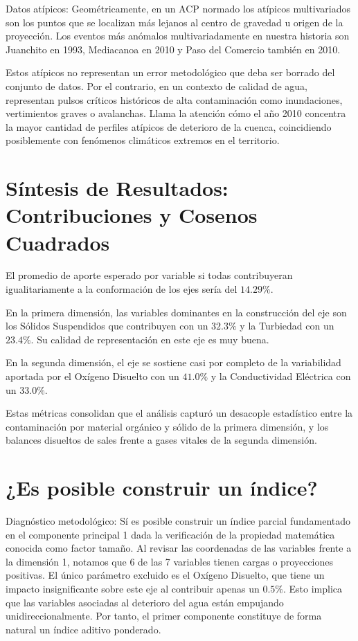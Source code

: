 \documentclass{article} %
\begin{document}
Datos atípicos: Geométricamente, en un ACP normado los atípicos multivariados son los puntos que se localizan más lejanos al centro de gravedad u origen de la proyección. Los eventos más anómalos multivariadamente en nuestra historia son Juanchito en 1993, Mediacanoa en 2010 y Paso del Comercio también en 2010.

Estos atípicos no representan un error metodológico que deba ser borrado del conjunto de datos. Por el contrario, en un contexto de calidad de agua, representan pulsos críticos históricos de alta contaminación como inundaciones, vertimientos graves o avalanchas. Llama la atención cómo el año 2010 concentra la mayor cantidad de perfiles atípicos de deterioro de la cuenca, coincidiendo posiblemente con fenómenos climáticos extremos en el territorio.

\section{Síntesis de Resultados: Contribuciones y Cosenos Cuadrados}
El promedio de aporte esperado por variable si todas contribuyeran igualitariamente a la conformación de los ejes sería del $14.29\%$.

En la primera dimensión, las variables dominantes en la construcción del eje son los Sólidos Suspendidos que contribuyen con un $32.3\%$ y la Turbiedad con un $23.4\%$. Su calidad de representación en este eje es muy buena. 

En la segunda dimensión, el eje se sostiene casi por completo de la variabilidad aportada por el Oxígeno Disuelto con un $41.0\%$ y la Conductividad Eléctrica con un $33.0\%$.

Estas métricas consolidan que el análisis capturó un desacople estadístico entre la contaminación por material orgánico y sólido de la primera dimensión, y los balances disueltos de sales frente a gases vitales de la segunda dimensión.

\section{¿Es posible construir un índice?}
Diagnóstico metodológico: Sí es posible construir un índice parcial fundamentado en el componente principal 1 dada la verificación de la propiedad matemática conocida como factor tamaño. Al revisar las coordenadas de las variables frente a la dimensión 1, notamos que 6 de las 7 variables tienen cargas o proyecciones positivas. El único parámetro excluido es el Oxígeno Disuelto, que tiene un impacto insignificante sobre este eje al contribuir apenas un $0.5\%$. Esto implica que las variables asociadas al deterioro del agua están empujando unidireccionalmente. Por tanto, el primer componente constituye de forma natural un índice aditivo ponderado.
\end{document}

